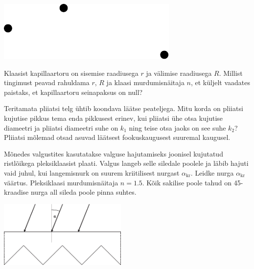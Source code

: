 \documentclass[10pt]{article}
\begin{document}
{\begin{center}
	\includegraphics[width=0.6\linewidth]{2009-v2g-08-yl}
\end{center}
\probend
\bigskip


Klaasist kapillaartoru on sisemise raadiusega $r$ ja välimise raadiusega $R$. Millist tingimust peavad rahuldama $r$, $R$ ja klaasi murdumisnäitaja $n$, et küljelt vaadates paistaks, et kapillaartoru seinapaksus on null?
\probend
\bigskip


Teritamata pliiatsi telg ühtib koondava läätse peateljega. Mitu korda on pliiatsi kujutise pikkus tema enda pikkusest erinev, kui pliiatsi ühe otsa kujutise diameetri ja pliiatsi diameetri suhe on $k_1$ ning teise otsa jaoks on see suhe $k_2$? Pliiatsi mõlemad otsad asuvad läätsest fookuskaugusest suuremal kaugusel.
\probend
\bigskip


Mõnedes valgustites kasutatakse valguse hajutamiseks joonisel kujutatud ristlõikega
pleksiklaasist plaati. Valgus langeb selle siledale poolele ja läbib hajuti vaid juhul, kui
langemisnurk on suurem kriitilisest nurgast $\alpha_\mathrm{kr}$. Leidke nurga $\alpha_\mathrm{kr}$ väärtus. Pleksiklaasi
murdumisnäitaja $n=\num{1,5}$. Kõik sakilise poole tahud on \num{45}-kraadise nurga all sileda poole pinna
suhtes.
\begin{center}
	\includegraphics[width=0.475\textwidth]{2010-v2g-08-hajuti.eps}
\end{center}
\probend
\bigskip

}
\end{document}
